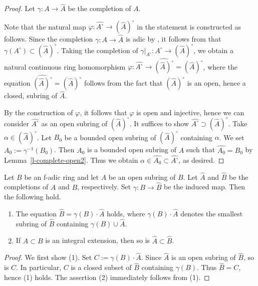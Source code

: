\begin{proof}
Let $\gamma:A \to \widehat{A}$ be the completion of $A$. 

Note that the natural map $\varphi:\widehat{A^{\circ}} \to (\widehat{A})^{\circ}$ in the statement is 
constructed as follows. 
Since the completion $\gamma:A \to \widehat{A}$ is adic by 
\cite[Lemma 1.6]{Hub93}, 
it follows from \cite[Corollary 1.3(iii), Lemma 1.8(i)]{Hub93} that $\gamma(A^{\circ}) \subset (\widehat{A})^{\circ}$. 
Taking the completion of $\gamma|_{A^{\circ}}:A^{\circ} \to (\widehat{A})^{\circ}$, 
we obtain a natural continuous ring homomorphism 
$\varphi:\widehat{A^{\circ}} \to \widehat{(\widehat{A})^{\circ}}=(\widehat{A})^{\circ}$, 
where the equation $\widehat{(\widehat{A})^{\circ}}=(\widehat{A})^{\circ}$ 
follows from the fact that $(\widehat{A})^{\circ}$ is 
an open, hence a closed, subring of $\widehat{A}$. 


By the construction of $\varphi$, 
it follows that $\varphi$ is open and injective, 
hence we can consider $\widehat{A^{\circ}}$ as an open subring of $(\widehat{A})^{\circ}$. 
It suffices to show $\widehat{A^{\circ}} \supset (\widehat{A})^{\circ}$. 
Take $\alpha \in (\widehat{A})^{\circ}$. 
Let $B_0$ be a bounded open subring of $(\widehat{A})^{\circ}$ containing $\alpha$. 
We set $A_0:=\gamma^{-1}(B_0)$. 
Then $A_0$ is a bounded open subring of $A$ such that  $\widehat{A_0}=B_0$ by Lemma~\ref{l-complete-open2}. 
Thus we obtain $\alpha \in \widehat{A_0} \subset \widehat{A^{\circ}}$, 
as desired. 
\end{proof}



\begin{lem}\label{l-integral-completion}
Let $B$ be an f-adic ring and let $A$ be an open subring of $B$. 
Let $\widehat{A}$ and $\widehat{B}$ be the completions of $A$ and $B$, 
respectively. 
Set $\gamma:B \to \widehat{B}$ be the induced map. 
Then the following hold. 
\begin{enumerate}
\item The equation $\widehat{B}=\gamma(B) \cdot \widehat{A}$ holds, 
where $\gamma(B) \cdot \widehat{A}$ denotes the smallest subring of $\widehat{B}$ containing $\gamma(B) \cup \widehat{A}$. 
\item If $A \subset B$ is an integral extension, then so is $\widehat{A} \subset \widehat{B}$. 
\end{enumerate}
\end{lem}

\begin{proof}
We first show (1). Set $C:=\gamma(B) \cdot \widehat{A}$. 
Since $\widehat{A}$ is an open subring of $\widehat{B}$, 
so is $C$. 
In particular, $C$ is a closed subset of $\widehat{B}$ containing $\gamma(B)$. 
Thus $\widehat{B}=C$, hence (1) holds. 
The assertion (2) immediately follows from (1). 
\end{proof}


